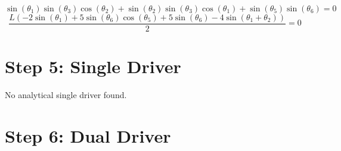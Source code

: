\documentclass[12pt, a4paper]{article}
\begin{document}
\[ \sin{\left(\theta_{1} \right)} \sin{\left(\theta_{3} \right)} \cos{\left(\theta_{2} \right)} + \sin{\left(\theta_{2} \right)} \sin{\left(\theta_{3} \right)} \cos{\left(\theta_{1} \right)} + \sin{\left(\theta_{5} \right)} \sin{\left(\theta_{6} \right)} = 0 \]
\[ \frac{L \left(- 2 \sin{\left(\theta_{1} \right)} + 5 \sin{\left(\theta_{6} \right)} \cos{\left(\theta_{5} \right)} + 5 \sin{\left(\theta_{6} \right)} - 4 \sin{\left(\theta_{1} + \theta_{2} \right)}\right)}{2} = 0 \]


\section{Step 5: Single Driver}
No analytical single driver found.


\section{Step 6: Dual Driver}
\end{document}
